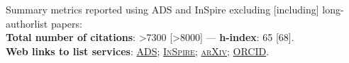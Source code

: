 Summary metrics reported using ADS and InSpire excluding [including] long-authorlist papers:
\\
\textcolor{mark_color}{\textbf{Total number of citations}}: >7300 [>8000]
 --- 
\textcolor{mark_color}{\textbf{h-index}}: 65 [68].
\\
\textcolor{mark_color}{\textbf{Web links to list services}}:
\href{https://davidegerosa.com/myads}{\textsc{ADS}};
\href{https://davidegerosa.com/myinspire}{\textsc{InSpire}};
\href{http://davidegerosa.com/myarxiv}{\textsc{arXiv}};
\href{https://davidegerosa.com/myorcid}{\textsc{ORCID}}.